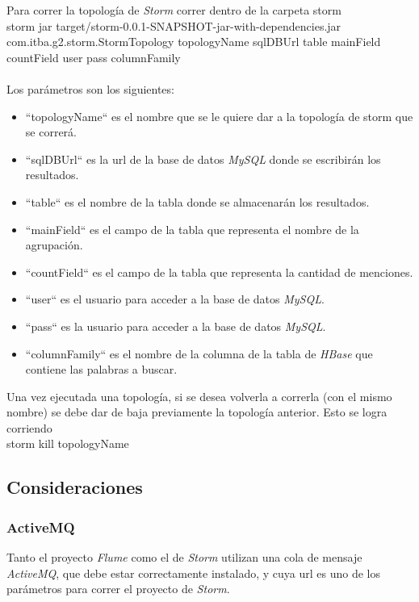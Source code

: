 \documentclass[a4paper,10pt]{article}
\begin{document}
Para correr la topología de \textit{Storm} correr dentro de la carpeta storm
\\

	storm jar target/storm-0.0.1-SNAPSHOT-jar-with-dependencies.jar com.itba.g2.storm.StormTopology topologyName sqlDBUrl table mainField countField user pass columnFamily
\\
\\
Los parámetros son los siguientes:

\begin{itemize}
	\item ``topologyName`` es el nombre que se le quiere dar a la topología de storm que se correrá.
	\item ``sqlDBUrl`` es la url de la base de datos \textit{MySQL} donde se escribirán los resultados.
	\item ``table`` es el nombre de la tabla donde se almacenarán los resultados.
	\item ``mainField`` es el campo de la tabla que representa el nombre de la agrupación.
	\item ``countField`` es el campo de la tabla que representa la cantidad de menciones.
	\item ``user`` es el usuario para acceder a la base de datos \textit{MySQL}.
	\item ``pass`` es la usuario para acceder a la base de datos \textit{MySQL}.
	\item ``columnFamily`` es el nombre de la columna de la tabla de \textit{HBase} que contiene las palabras a buscar.
\end{itemize}

Una vez ejecutada una topología, si se desea volverla a correrla (con el mismo nombre) se debe dar de baja previamente la topología anterior. Esto se logra corriendo
\\

	storm kill topologyName

\subsection{Consideraciones}

\subsubsection{ActiveMQ}

Tanto el proyecto \textit{Flume} como el de \textit{Storm} utilizan una cola de mensaje \textit{ActiveMQ}, que debe estar correctamente instalado,
y cuya url es uno de los parámetros para correr el proyecto de \textit{Storm}.
\end{document}
